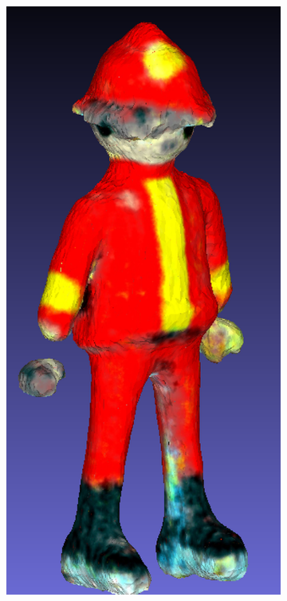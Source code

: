\begin{figure}[ht]
    \centering
    \small
    \begin{subfigure}[b]{0.18\textwidth}
        \centering
        \includegraphics[width=\textwidth]{etc/a high quality rendering of a playmobil firefighter/dreamfusion/dreamfusion_playmobil_result_resize.png}

\end{subfigure}
\end{figure}
